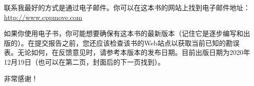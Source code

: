 联系我最好的方式是通过电子邮件。你可以在这本书的网站上找到电子邮件地址：\url{http://www.cppmove.com}

如果你使用电子书，你可能想要确保有这本书的最新版本（记住它是逐步编写和出版的）。在提交报告之前，您还应该检查该书的Web站点以获取当前已知的勘误表。无论如何，在反馈意见时，请参考本版本的发布日期。目前出版日期为2020年12月19日（也可以在第二页，封面后的下一页找到）。

非常感谢！






















